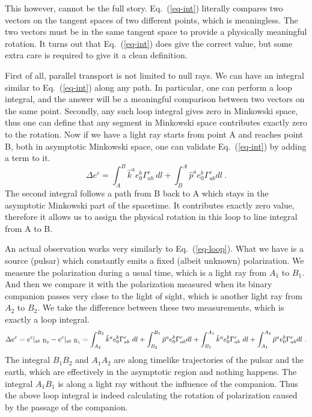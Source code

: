 \documentclass[aps,showpacs,onecolumn,floats,prd,superscriptaddress,nofootinbib]{revtex4}
\begin{document}
This however, cannot be the full story. 
Eq.~(\ref{eq-int}) literally compares two vectors on the tangent spaces of two different points, which is meaningless. 
The two vectors must be in the same tangent space to provide a physically meaningful rotation. 
It turns out that Eq.~(\ref{eq-int}) does give the correct value, but some extra care is required to give it a clean definition.

First of all, parallel transport is not limited to null rays. 
We can have an integral similar to Eq.~(\ref{eq-int}) along any path. 
In particular, one can perform a loop integral, and the answer will be a meaningful comparison between two vectors on the same point. 
Secondly, any such loop integral gives zero in Minkowski space, thus one can define that any segment in Minkowski space contributes exactly zero to the rotation. 
Now if we have a light ray starts from point A and reaches point B, both in asymptotic Minkowski space, one can validate Eq.~(\ref{eq-int}) by adding a term to it.
\begin{equation}
\Delta e^c = \int_A^B \hat{k}^a e_0^b \Gamma_{ab}^c~dl +
 \int_B^A \hat{p}^a e_0^b \Gamma_{ab}^c dl~.
\label{eq-loop}
\end{equation}
The second integral follows a path from B back to A which stays in the asymptotic Minkowski part of the spacetime. 
It contributes exactly zero value, therefore it allows us to assign the physical rotation in this loop to line integral from A to B.

An actual observation works very similarly to Eq.~(\ref{eq-loop}). 
What we have is a source (pulsar) which constantly emits a fixed (albeit unknown) polarization. 
We measure the polarization during a usual time, which is a light ray from $A_1$ to $B_1$. 
And then we compare it with the polarization measured when its binary companion passes very close to the light of sight, which is another light ray from $A_2$ to $B_2$. 
We take the difference between these two measurements, which is exactly a loop integral.
\begin{equation}
\Delta e^c = e^c|_{\rm at \ B_2} - e^c|_{\rm at \ B_1}
= \int_{A_2}^{B_2} \hat{k}^a e_0^b \Gamma_{ab}^c~dl +
\int_{B_2}^{B_1} \hat{p}^a e_0^b \Gamma_{ab}^c dl +
\int_{B_1}^{A_1} \hat{k}^a e_0^b \Gamma_{ab}^c~dl +
\int_{A_1}^{A_2} \hat{p}^a e_0^b \Gamma_{ab}^c dl~.
\label{eq-pulsar}
\end{equation}
The integral $B_1B_2$ and $A_1A_2$ are along timelike trajectories of the pulsar and the earth, which are effectively in the asymptotic region and nothing happens. 
The integral $A_1B_1$ is along a light ray without the influence of the companion. 
Thus the above loop integral is indeed calculating the rotation of polarization caused by the passage of the companion.
\end{document}
